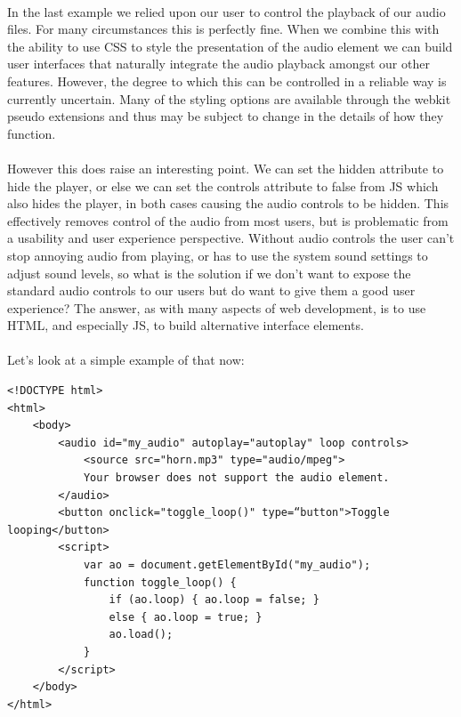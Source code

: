 \paragraph{} In the last example we relied upon our user to control the playback of our audio files. For many circumstances this is perfectly fine. When we combine this with the ability to use CSS to style the presentation of the audio element we can build user interfaces that naturally integrate the audio playback amongst our other features. However, the degree to which this can be controlled in a reliable way is currently uncertain. Many of the styling options are available through the webkit pseudo extensions and thus may be subject to change in the details of how they function.
\paragraph{} However this does raise an interesting point. We can set the hidden attribute to hide the player, or else we can set the controls attribute to false from JS which also hides the player, in both cases causing the audio controls to be hidden. This effectively removes control of the audio from most users, but is problematic from a usability and user experience perspective. Without audio controls the user can't stop annoying audio from playing, or has to use the system sound settings to adjust sound levels, so what is the solution if we don't want to expose the standard audio controls to our users but do want to give them a good user experience? The answer, as with many aspects of web development, is to use HTML, and especially JS, to build alternative interface elements.
\paragraph{} Let's look at a simple example of that now:

\begin{lstlisting}
<!DOCTYPE html>
<html>
    <body>
        <audio id="my_audio" autoplay="autoplay" loop controls>
            <source src="horn.mp3" type="audio/mpeg">
            Your browser does not support the audio element.
        </audio>
        <button onclick="toggle_loop()" type=“button">Toggle looping</button>
        <script>
            var ao = document.getElementById("my_audio");
            function toggle_loop() {
                if (ao.loop) { ao.loop = false; }
                else { ao.loop = true; }
                ao.load();
            }
        </script>
    </body>
</html>
\end{lstlisting}

